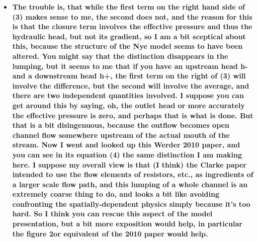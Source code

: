 \documentclass[11pt]{article}
\begin{document}
\begin{itemize}

\item \textbf{
    The trouble is, that while the first term on the right hand side of (3) makes sense to me, the second does not, and the reason for this is that the closure term involves the effective pressure and thus the hydraulic head, but not its gradient, so I am a bit sceptical about this, because the structure of the Nye model seems to have been altered.
    You might say that the distinction disappears in the lumping, but it seems to me that if you have an upstream head h- and a downstream head h+, the first term on the right of (3) will involve the difference, but the second will involve the average, and there are two independent quantities involved.
    I suppose you can get around this by saying, oh, the outlet head or more accurately the effective pressure is zero, and perhaps that is what is done.
    But that is a bit disingenuous, because the outflow becomes open channel flow somewhere upstream of the actual mouth of the stream.
    Now I went and looked up this Werder 2010 paper, and you can see in its equation (4) the same distinction I am making here.
    I suppose my overall view is that (I think) the Clarke paper intended to use the flow elements of resistors, etc., as ingredients of a larger scale flow path, and this lumping of a whole channel is an extremely coarse thing to do, and looks a bit like avoiding confronting the spatially-dependent physics simply because it’s too hard.
    So I think you can rescue this aspect of the model presentation, but a bit more exposition would help, in particular the figure 2or equivalent of the 2010 paper would help.}



\end{itemize}
\end{document}
